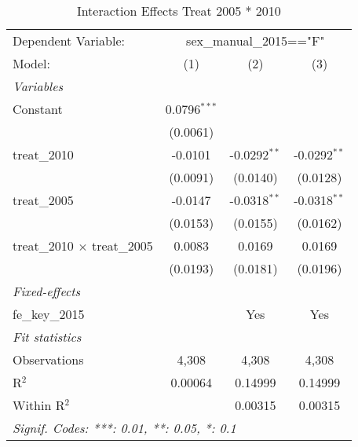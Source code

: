 
\begin{table}[htbp]
   \caption{Interaction Effects Treat 2005 * 2010}
   \centering
   \begin{tabular}{lccc}
      \tabularnewline \midrule \midrule
      Dependent Variable: & \multicolumn{3}{c}{sex\_manual\_2015=="F"}\\
      Model:                              & (1)            & (2)            & (3)\\  
      \midrule
      \emph{Variables}\\
      Constant                            & 0.0796$^{***}$ &                &   \\   
                                          & (0.0061)       &                &   \\   
      treat\_2010                         & -0.0101        & -0.0292$^{**}$ & -0.0292$^{**}$\\   
                                          & (0.0091)       & (0.0140)       & (0.0128)\\   
      treat\_2005                         & -0.0147        & -0.0318$^{**}$ & -0.0318$^{**}$\\   
                                          & (0.0153)       & (0.0155)       & (0.0162)\\   
      treat\_2010 $\times$ treat\_2005    & 0.0083         & 0.0169         & 0.0169\\   
                                          & (0.0193)       & (0.0181)       & (0.0196)\\   
      \midrule
      \emph{Fixed-effects}\\
      fe\_key\_2015                       &                & Yes            & Yes\\  
      \midrule
      \emph{Fit statistics}\\
      Observations                        & 4,308          & 4,308          & 4,308\\  
      R$^2$                               & 0.00064        & 0.14999        & 0.14999\\  
      Within R$^2$                        &                & 0.00315        & 0.00315\\  
      \midrule \midrule
      \multicolumn{4}{l}{\emph{Signif. Codes: ***: 0.01, **: 0.05, *: 0.1}}\\
   \end{tabular}
\end{table}


